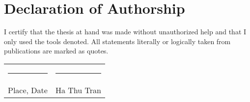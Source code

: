 
\chapter*{Declaration of Authorship}

I certify that the thesis at hand was made without
unauthorized help and that I only used the tools denoted.
All statements literally or logically taken from publications
are marked as quotes.  

\vspace{2cm}

\noindent
\begin{tabular}{p{} l}
  \rule{\textwidth/3}{0.4pt}   &   \rule{\textwidth/3}{0.4pt} \\
  Place, Date                  &   Ha Thu Tran
\end{tabular}
